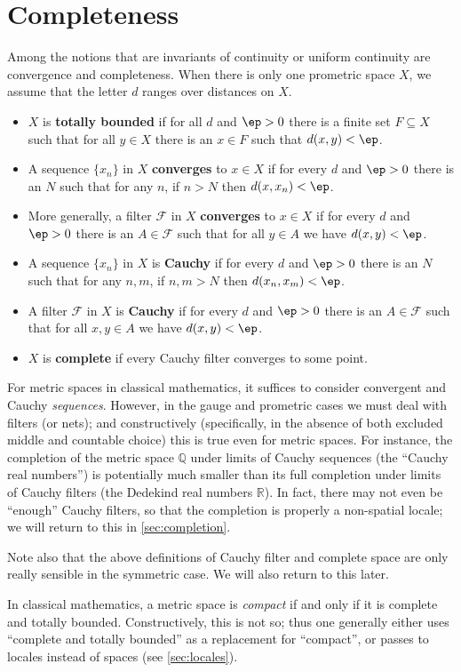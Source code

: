 \documentclass{article}
\def\R{\mathbb{R}}
\def\F{\mathcal{F}}
\begin{document}
\section{Completeness}
\label{sec:completeness}

Among the notions that are invariants of continuity or uniform continuity are convergence and completeness.
When there is only one prometric space $X$, we assume that the letter $d$ ranges over distances on $X$.

\begin{itemize}
\item $X$ is \textbf{totally bounded} if for all $d$ and $\ep>0$ there is a finite set $F\subseteq X$ such that for all $y\in X$ there is an $x\in F$ such that $d(x,y)<\ep$.
\item A sequence $\{x_n\}$ in $X$ \textbf{converges} to $x\in X$ if for every $d$ and $\ep>0$ there is an $N$ such that for any $n$, if $n>N$ then $d(x,x_n)<\ep$.
\item More generally, a filter $\F$ in $X$ \textbf{converges} to $x\in X$ if for every $d$ and $\ep>0$ there is an $A\in\F$ such that for all $y\in A$ we have $d(x,y)<\ep$.
\item A sequence $\{x_n\}$ in $X$ is \textbf{Cauchy} if for every $d$ and $\ep>0$ there is an $N$ such that for any $n,m$, if $n,m>N$ then $d(x_n,x_m)<\ep$.
\item A filter $\F$ in $X$ is \textbf{Cauchy} if for every $d$ and $\ep>0$ there is an $A\in\F$ such that for all $x,y\in A$ we have $d(x,y)<\ep$.
\item $X$ is \textbf{complete} if every Cauchy filter converges to some point.
\end{itemize}

For metric spaces in classical mathematics, it suffices to consider convergent and Cauchy \emph{sequences}.
However, in the gauge and prometric cases we must deal with filters (or nets); and constructively (specifically, in the absence of both excluded middle and countable choice) this is true even for metric spaces.
For instance, the completion of the metric space $\mathbb{Q}$ under limits of Cauchy sequences (the ``Cauchy real numbers'') is potentially much smaller than its full completion under limits of Cauchy filters (the Dedekind real numbers $\R$).
In fact, there may not even be ``enough'' Cauchy filters, so that the completion is properly a non-spatial locale; we will return to this in \cref{sec:completion}.

Note also that the above definitions of Cauchy filter and complete space are only really sensible in the symmetric case.
We will also return to this later.

In classical mathematics, a metric space is \emph{compact} if and only if it is complete and totally bounded.
Constructively, this is not so; thus one generally either uses ``complete and totally bounded'' as a replacement for ``compact'', or passes to locales instead of spaces (see \cref{sec:locales}).






\end{document}
